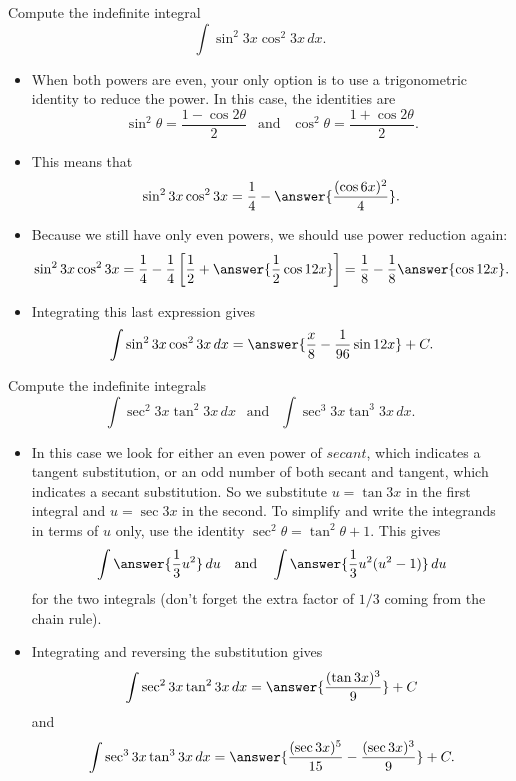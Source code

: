 \documentclass{ximera}
\begin{document}
\begin{example}
Compute the indefinite integral
\[ \int \sin^2 3x \cos^2 3x \, dx. \]
\begin{itemize}
\item When both powers are even, your only option is to use a trigonometric identity to reduce the power. In this case, the identities are
\[ \sin^2 \theta = \frac{1 - \cos 2 \theta}{2}  \ \ \text{ and } \ \ \cos^2 \theta = \frac{1 + \cos 2 \theta}{2}. \]
\item 
This means that 
\[ \sin^2 3x \cos^2 3 x = \frac{1}{4} - \answer{ \frac{(\cos 6 x)^2}{4}}. \]
\item
Because we still have only even powers, we should use power reduction again:
\[ \sin^2 3x \cos^2 3x = \frac{1}{4} - \frac{1}{4} \left[ \frac{1}{2} + \answer{\frac{1}{2} \cos 12x} \right] = \frac{1}{8} - \frac{1}{8} \answer{\cos 12x}. \]
\item
Integrating this last expression gives
\[ \int \sin^2 3x \cos^2 3x \, dx = \answer{\frac{x}{8} - \frac{1}{96} \sin 12x} + C. \]
\end{itemize}
\end{example}

\begin{example}
Compute the indefinite integrals
\[ \int \sec^2 3x \tan^2 3x \, dx \ \ \text{ and } \ \ \int \sec^3 3x \tan^3 3x \, dx. \]
\begin{itemize}
\item In this case we look for either an even power of $secant$, which indicates a tangent substitution, or an odd number of both secant and tangent, which indicates a secant substitution. So we substitute $u = \tan 3x$ in the first integral and $u = \sec 3x$ in the second. To simplify and write the integrands in terms of $u$ only, use the identity $\sec^2 \theta = \tan^2 \theta + 1$.  This gives
\[ \int \answer{\frac{1}{3} u^2} \, du \ \ \text{ and } \ \ \int \answer{\frac{1}{3} u^2 (u^2 - 1)} \, du \]
for the two integrals (don't forget the extra factor of $1/3$ coming from the chain rule).
\item Integrating and reversing the substitution gives
\[ \int \sec^2 3x \tan^2 3x \, dx = \answer{ \frac{(\tan 3x)^3}{9}} + C \]
and
\[ \int \sec^3 3x \tan^3 3x \, dx = \answer{ \frac{(\sec 3x)^5}{15} - \frac{(\sec 3x)^3}{9}} + C. \]
\end{itemize}
\end{example}
\end{document}
